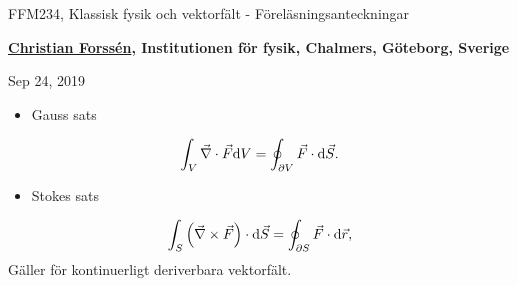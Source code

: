 \documentclass[%
oneside,                 %
final,                   %
10pt]{article}
\newenvironment{summary_mdfboxadmon}[1][]{
\begin{summary_mdfboxmdframed}[frametitle=#1]
}
{
\end{summary_mdfboxmdframed}
}
\begin{document}

\newcommand{\exercisesection}[1]{\subsection*{#1}}







\thispagestyle{empty}

\begin{center}
{\LARGE\bf
\begin{spacing}{1.25}
FFM234, Klassisk fysik och vektorfält - Föreläsningsanteckningar
\end{spacing}
}
\end{center}


\begin{center}
{\bf \href{{http://fy.chalmers.se/subatom/tsp/}}{Christian Forssén}, Institutionen för fysik, Chalmers, Göteborg, Sverige${}^{}$} \\ [0mm]
\end{center}

\begin{center}
\end{center}
    

\begin{center}
Sep 24, 2019
\end{center}

\vspace{1cm}



\begin{summary_mdfboxadmon}
\begin{itemize}
\item Gauss sats
\end{itemize}

\noindent
\begin{equation}
  \int_V \vec{\nabla} \cdot \vec{F} \mbox{d}V = \oint_{\partial V} \vec{F} \cdot \mbox{d} \vec{S}.
\end{equation}
\begin{itemize}
\item Stokes sats
\end{itemize}

\noindent
\begin{equation}
  \int_S \left( \vec{\nabla} \times \vec{F}\right) \cdot \mbox{d}\vec{S} = \oint_{\partial S} \vec{F}\cdot
\mbox{d}\vec{r},
\end{equation}
Gäller för kontinuerligt deriverbara vektorfält.
\end{summary_mdfboxadmon} %
\end{document}
